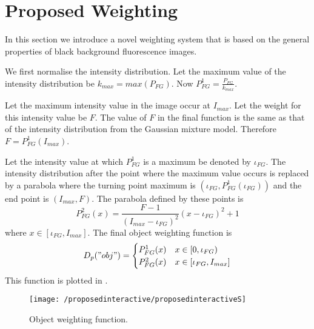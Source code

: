 \section{Proposed Weighting}
\label{sec:interactiveproposedweighting}

In this section we introduce a novel weighting system that is based on the general properties of black background fluorescence images.

\begin{definition}
	We first normalise the intensity distribution. Let the maximum value of the intensity distribution be $k_{max}= max(P_{FG})$. Now $P_{FG}^{1} = \frac{P_{FG}}{k_{max}}$.
	
	Let the maximum intensity value in the image occur at $I_{max}$. Let the weight for this intensity value be $F$. The value of $F$ in the final function is the same as that of the intensity distribution from the Gaussian mixture model. Therefore $F = P_{FG}^{1}(I_{max})$.
	
	Let the intensity value at which $P_{FG}^{1}$ is a maximum be denoted by $\iota_{FG}$. The intensity distribution after the point where the maximum value occurs is replaced by a parabola where the turning point maximum is $\left(\iota_{FG}, P_{FG}^{1}(\iota_{FG})\right)$ and the end point is $(I_{max},F)$. The parabola defined by these points is 
	\begin{equation}
		P_{FG}^2(x) = \frac{F-1}{(I_{max}-\iota_{FG})^2}(x-\iota_{FG})^2 +1 
	\end{equation}
	where $x \in [\iota_{FG},I_{max}]$.
	The final object weighting function  is
	\begin{equation}
		D_p("obj") = \begin{cases} 
		P_{FG}^1(x) & x \in [0,\iota_{FG}) \\
		P_{FG}^2(x) & x \in [\iota_{FG},I_{max}]
		\end{cases}
	\end{equation}
	This function is plotted in . 
		
	\begin{figure}[!h]
		\centering
		\texttt{[image: /proposedinteractive/proposedinteractiveS]}
		\caption{Object weighting function.}
		\label{fig:proposedinteractiveS}
	\end{figure}
\end{definition}

